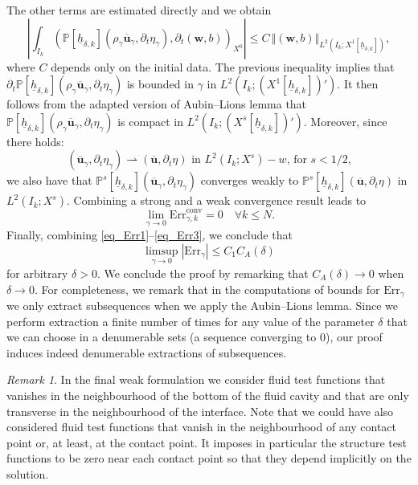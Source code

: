 \documentclass[JEP,XML,SOM,Unicode,NoFloatCountersInSection]{cedram}
\newcommand{\conv}{\mathrm{conv}}
\newcommand{\Err}{\mathrm{Err}}
\theoremstyle{remark}
\newtheorem{remark}[theorem]{Remark}
\theoremstyle{definition}
\newcommand{\norme}[1]{\,\Vert #1\Vert}
\newcommand{\ug}{\boldsymbol{u}}
\newcommand{\wg}{\boldsymbol{w}}
\newcommand{\hb}{{\underline{h}}}
\begin{document}
The other terms are estimated directly and we obtain
\[
\left\vert \int_{I_{k}}\left( \mathbb{P}[\hb_{\delta, k}](\rho_{\gamma}\overline{\ug}_{\gamma},\partial_{t}\eta_{\gamma}), \partial_{t}(\wg,b) \right)_{X^0}\right\vert \leq C\norme{(\wg,b)}_{L^{2}(I_{k};X^{1}[\hb_{\delta, k}])},
\]
where $C$ depends only on the initial data.
The previous inequality implies that $\partial_{t}\mathbb{P}[\hb_{\delta, k}](\rho_{\gamma}\overline{\ug}_{\gamma},\partial_{t}\eta_{\gamma})$ is bounded in $\gamma$ in $L^{2}(I_{k};(X^{1}[\hb_{\delta, k}])')$. It then follows from the adapted version of Aubin--Lions lemma that $\mathbb{P}[\hb_{\delta, k}](\rho_{\gamma}\overline{\ug}_{\gamma},\partial_{t}\eta_{\gamma})$ is compact in $L^{2}(I_{k};(X^{s}[\hb_{\delta, k}])')$. Moreover, since there holds:
\[
(\overline{\ug}_{\gamma},\partial_t \eta_{\gamma}) \rightharpoonup (\overline{\ug},\partial_t \eta) \text{ in $L^2(I_k; X^s)-w$, for $s<1/2$,}
\]
we also have that
$\mathbb P^s[\hb_{\delta,k}](\overline{\ug}_{\gamma},\partial_t \eta_{\gamma})$ converges weakly to $\mathbb P^s[\hb_{\delta,k}](\overline{\ug},\partial_t \eta)$ in $L^2(I_k;X^s)$. Combining a strong and a weak convergence result leads to
\begin{equation} \label{eq_Err3}
\lim_{\gamma \to 0} \Err_{\gamma,k}^{\conv} = 0 \quad \forall k \leq N.
\end{equation}
Finally, combining \eqref{eq_Err1}--\eqref{eq_Err3}, we conclude that
\[
\limsup_{\gamma \to 0} |\Err_{\gamma} | \leq C_1C_A(\delta)
\]
for arbitrary $\delta >0$. We conclude the proof by remarking that $C_A(\delta) \to 0$ when $\delta \to 0$. For completeness, we remark that in the computations of bounds for $\Err_{\gamma}$ we only extract subsequences when we apply the Aubin--Lions lemma. Since we perform extraction a finite number of times for any value of the parameter $\delta$ that we can choose in a denumerable sets (\ie a sequence converging to $0$), our proof induces indeed denumerable extractions of subsequences.

\begin{remark} \label{rem:testfunction}
In the final weak formulation we consider fluid test functions that vanishes in the neighbourhood of the bottom of the fluid cavity and that are only transverse in the neighbourhood of the interface. Note that we could have also considered fluid test functions that vanish in the neighbourhood of any contact point or, at least, at the contact point. It imposes in particular the structure test functions to be zero near each contact point so that they depend implicitly on the solution.
\end{remark}
\end{document}
